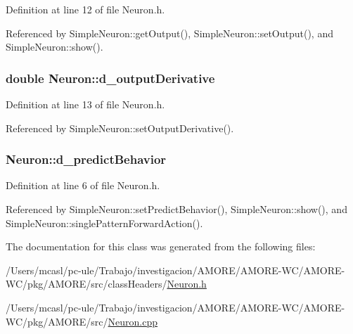 Definition at line 12 of file Neuron.h.



Referenced by SimpleNeuron::getOutput(), SimpleNeuron::setOutput(), and SimpleNeuron::show().

\hypertarget{class_neuron_a7145844d8be9fb33ad77d47eb50fb9af}{
\subsubsection[{d\_\-outputDerivative}]{\setlength{\rightskip}{0pt plus 5cm}double {\bf Neuron::d\_\-outputDerivative}}}
\label{class_neuron_a7145844d8be9fb33ad77d47eb50fb9af}


Definition at line 13 of file Neuron.h.



Referenced by SimpleNeuron::setOutputDerivative().

\hypertarget{class_neuron_a2522e221f58c84bd3a1c32647da4a411}{
\subsubsection[{d\_\-predictBehavior}]{ {\bf Neuron::d\_\-predictBehavior}}}
\label{class_neuron_a2522e221f58c84bd3a1c32647da4a411}


Definition at line 6 of file Neuron.h.



Referenced by SimpleNeuron::setPredictBehavior(), SimpleNeuron::show(), and SimpleNeuron::singlePatternForwardAction().



The documentation for this class was generated from the following files:\begin{DoxyCompactItemize}
\item 
/Users/mcasl/pc-\/ule/Trabajo/investigacion/AMORE/AMORE-\/WC/AMORE-\/WC/pkg/AMORE/src/classHeaders/\hyperlink{_neuron_8h}{Neuron.h}\item 
/Users/mcasl/pc-\/ule/Trabajo/investigacion/AMORE/AMORE-\/WC/AMORE-\/WC/pkg/AMORE/src/\hyperlink{_neuron_8cpp}{Neuron.cpp}\end{DoxyCompactItemize}

